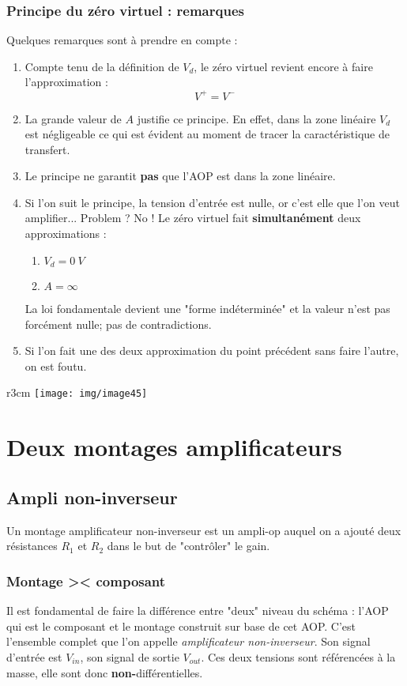 \subsubsection{Principe du zéro virtuel : remarques}
Quelques remarques sont à prendre en compte :
\begin{enumerate}
	\item Compte tenu de la définition de $V_d$, le zéro virtuel revient encore à faire l'approximation :
	      \begin{equation}
	      	V^+ = V^-
	      \end{equation}
	\item La grande valeur de $A$ justifie ce principe. En effet, dans la zone linéaire $V_d$ est négligeable ce qui est évident au moment de tracer la caractéristique de transfert.
	\item Le principe ne garantit \textbf{pas} que l'AOP est dans la zone linéaire.
	\item Si l'on suit le principe, la tension d'entrée est nulle, or c'est elle que l'on veut amplifier... Problem ? No ! Le zéro virtuel fait \textbf{simultanément} deux approximations :
	      \begin{enumerate}
	      	\item $V_d = 0\ V$
	      	\item $A = \infty$
	      \end{enumerate}
	      La loi fondamentale devient une "forme indéterminée" et la valeur n'est pas forcément nulle; pas de contradictions.
	\item Si l'on fait une des deux approximation du point précédent sans faire l'autre, on est foutu.
\end{enumerate}

\begin{wrapfigure}[9]{r}{3cm}
	\texttt{[image: img/image45]}
\end{wrapfigure}
\section{Deux montages amplificateurs}
\subsection{Ampli non-inverseur}
Un montage amplificateur non-inverseur est un ampli-op auquel on a ajouté deux résistances $R_1$ et $R_2$ dans le but de "contrôler" le gain. 

\subsubsection{Montage >< composant}
Il est fondamental de faire la différence entre "deux" niveau du schéma : l'AOP qui est le composant et le montage construit sur base de cet AOP. C'est l'ensemble complet que l'on appelle \textit{amplificateur non-inverseur}. Son signal d'entrée est $V_{in}$, son signal de sortie $V_{out}$. Ces deux tensions sont référencées à la masse, elle sont donc \textbf{non-}différentielles.\\

